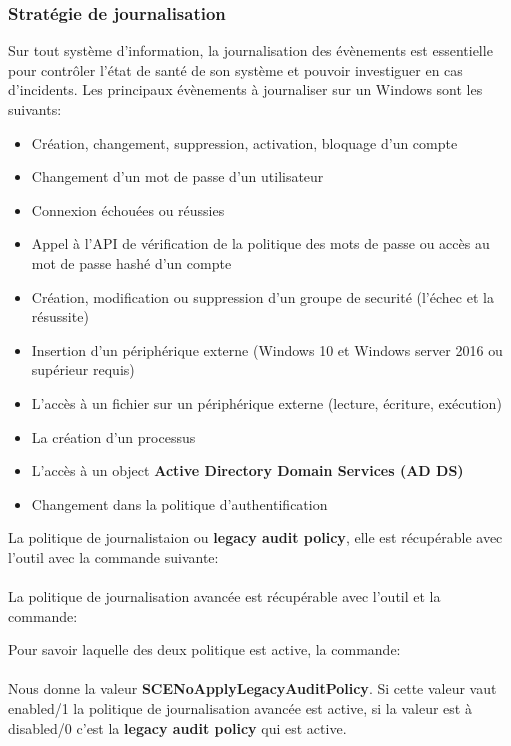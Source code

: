 \documentclass[twoside,a4paper,12pt,titlepage]{book}
\begin{document}
\subsubsection{Stratégie de journalisation}
Sur tout système d'information, la journalisation des évènements est essentielle pour contrôler l'état de santé de son système et pouvoir investiguer en cas d'incidents. Les principaux évènements à journaliser sur un Windows sont les suivants:
\begin{itemize}
	\item Création, changement, suppression, activation, bloquage d'un compte
	\item Changement d'un mot de passe d'un utilisateur
	\item Connexion échouées ou réussies
	\item Appel à l'API de vérification de la politique des mots de passe ou accès au mot de passe hashé d'un compte
	\item Création, modification ou suppression d'un groupe de securité (l'échec et la résussite)
	\item Insertion d'un périphérique externe (Windows 10 et Windows server 2016 ou supérieur requis)
	\item L'accès à un fichier sur un périphérique externe (lecture, écriture, exécution)
	\item La création d'un processus
	\item L'accès à un object \textbf{Active Directory Domain Services (AD DS)}
	\item Changement dans la politique d'authentification
\end{itemize}

La politique de journalistaion ou \textbf{legacy audit policy}, elle est récupérable avec l'outil  avec la commande suivante:\\
\\

La politique de journalisation avancée est récupérable avec l'outil  et la commande:\\

Pour savoir laquelle des deux politique est active, la commande:\\
\\
Nous donne la valeur \textbf{SCENoApplyLegacyAuditPolicy}. Si cette valeur vaut enabled/1 la politique de journalisation avancée est active, si la valeur est à disabled/0 c'est la  \textbf{legacy audit policy} qui est active.
\end{document}
